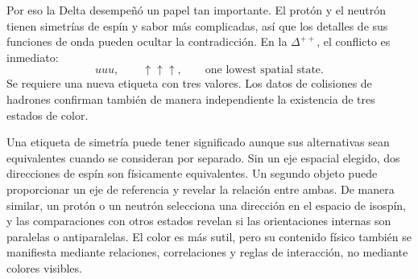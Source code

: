 \begin{classroomqa}
\end{classroomqa}


\begin{classroomqa}
\end{classroomqa}

Por eso la Delta desempeñó un papel tan importante. El protón y el neutrón tienen simetrías de espín y sabor más complicadas, así que los detalles de sus funciones de onda pueden ocultar la contradicción. En la \(\Delta^{++}\), el conflicto es inmediato:
\begin{equation}
uuu,\qquad
\uparrow\uparrow\uparrow,
\qquad
\text{one lowest spatial state}.
\end{equation}
Se requiere una nueva etiqueta con tres valores. Los datos de colisiones de hadrones confirman también de manera independiente la existencia de tres estados de color.

Una etiqueta de simetría puede tener significado aunque sus alternativas sean equivalentes cuando se consideran por separado. Sin un eje espacial elegido, dos direcciones de espín son físicamente equivalentes. Un segundo objeto puede proporcionar un eje de referencia y revelar la relación entre ambas. De manera similar, un protón o un neutrón selecciona una dirección en el espacio de isospín, y las comparaciones con otros estados revelan si las orientaciones internas son paralelas o antiparalelas. El color es más sutil, pero su contenido físico también se manifiesta mediante relaciones, correlaciones y reglas de interacción, no mediante colores visibles.

